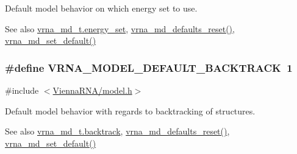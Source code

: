 Default model behavior on which energy set to use. 

\begin{DoxySeeAlso}{See also}
\hyperlink{group__model__details_a5eee4e3b468eb690d1407e0178dafb3f}{vrna\+\_\+md\+\_\+t.\+energy\+\_\+set}, \hyperlink{group__model__details_ga70834424cf804d149937de89f80ceb45}{vrna\+\_\+md\+\_\+defaults\+\_\+reset()}, \hyperlink{group__model__details_ga8ac6ff84936282436f822644bf841f66}{vrna\+\_\+md\+\_\+set\+\_\+default()} 
\end{DoxySeeAlso}
\subsubsection[{\texorpdfstring{V\+R\+N\+A\+\_\+\+M\+O\+D\+E\+L\+\_\+\+D\+E\+F\+A\+U\+L\+T\+\_\+\+B\+A\+C\+K\+T\+R\+A\+CK}{VRNA_MODEL_DEFAULT_BACKTRACK}}]{\setlength{\rightskip}{0pt plus 5cm}\#define V\+R\+N\+A\+\_\+\+M\+O\+D\+E\+L\+\_\+\+D\+E\+F\+A\+U\+L\+T\+\_\+\+B\+A\+C\+K\+T\+R\+A\+CK~1}\hypertarget{group__model__details_ga3fda8006ab84baf817bd8e5ccbc6bb35}{}\label{group__model__details_ga3fda8006ab84baf817bd8e5ccbc6bb35}


{\ttfamily \#include $<$\hyperlink{model_8h}{Vienna\+R\+N\+A/model.\+h}$>$}



Default model behavior with regards to backtracking of structures. 

\begin{DoxySeeAlso}{See also}
\hyperlink{group__model__details_a31f4471608cbdd03887f63c281823adb}{vrna\+\_\+md\+\_\+t.\+backtrack}, \hyperlink{group__model__details_ga70834424cf804d149937de89f80ceb45}{vrna\+\_\+md\+\_\+defaults\+\_\+reset()}, \hyperlink{group__model__details_ga8ac6ff84936282436f822644bf841f66}{vrna\+\_\+md\+\_\+set\+\_\+default()} 
\end{DoxySeeAlso}
